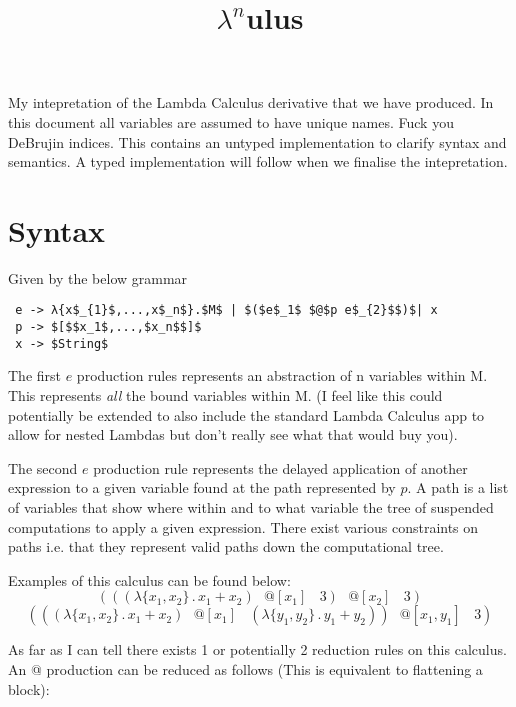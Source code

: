 \documentclass{article}
\title{$\lambda^{n}$ulus}
\date{}
\begin{document}
\maketitle
\vspace{-10mm}
\noindent My intepretation of the Lambda Calculus derivative that we have produced. In this document all variables are assumed to have unique names. Fuck you DeBrujin indices. This contains an untyped implementation to clarify syntax and semantics. A typed implementation will follow when we finalise the intepretation.
\section{Syntax}
Given by the below grammar

\begin{lstlisting}
 e -> λ{x$_{1}$,...,x$_n$}.$M$ | $($e$_1$ $@$p e$_{2}$$)$| x
 p -> $[$$x_1$,...,$x_n$$]$
 x -> $String$
\end{lstlisting}

\noindent The first $e$ production rules represents an abstraction of n variables within M. This represents \emph{all} the bound variables within M. (I feel like this could potentially be extended to also include the standard Lambda Calculus app to allow for nested Lambdas but don't really see what that would buy you).
\par
\noindent The second $e$ production rule represents the delayed application of another expression to a given variable found at the path represented by $p$. A path is a list of variables that show where within and to what variable the tree of suspended computations to apply a given expression. There exist various constraints on paths i.e. that they represent valid paths down the computational tree.
\par
\noindent Examples of this calculus can be found below:
\begin{equation}
    (((\lambda\{x_1, x_2\}\,.\, x_1 + x_2) \>\>\>@[x_1] \>\>\>\>3) \>\>\>@[x_2] \>\>\>\>3)
\end{equation}
\begin{equation}
    (((\lambda\{x_1, x_2\}\,.\, x_1 + x_2) \>\>\>@[x_1] \>\>\>\>(\lambda\{y_1, y_2\}\,.\, y_1 + y_2)) \>\>\>@[x_1, y_1] \>\>\>\>3)
\end{equation}

\noindent As far as I can tell there exists 1 or potentially 2 reduction rules on this calculus. An @ production can be reduced as follows (This is equivalent to flattening a block):
\end{document}
